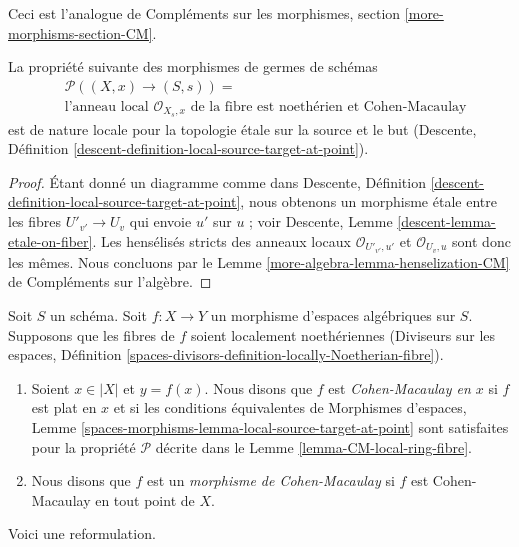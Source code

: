 \noindent
Ceci est l'analogue de Compléments sur les morphismes, section
\ref{more-morphisms-section-CM}.

\begin{lemma}
\label{lemma-CM-local-ring-fibre}
La propriété suivante des morphismes de germes de schémas
\begin{align*}
& \mathcal{P}((X, x) \to (S, s)) = \\
& \text{l'anneau local }
\mathcal{O}_{X_s, x}
\text{ de la fibre est noethérien et Cohen-Macaulay}
\end{align*}
est de nature locale pour la topologie étale sur la source et le but (Descente, Définition
\ref{descent-definition-local-source-target-at-point}).
\end{lemma}

\begin{proof}
Étant donné un diagramme comme dans
Descente, Définition \ref{descent-definition-local-source-target-at-point},
nous obtenons un morphisme étale entre les fibres
$U'_{v'} \to U_v$ qui envoie $u'$ sur $u$ ; voir
Descente, Lemme \ref{descent-lemma-etale-on-fiber}.
Les hensélisés stricts des anneaux locaux
$\mathcal{O}_{U'_{v'}, u'}$ et $\mathcal{O}_{U_v, u}$
sont donc les mêmes. Nous concluons par le
Lemme \ref{more-algebra-lemma-henselization-CM} de Compléments sur l'algèbre.
\end{proof}

\begin{definition}
\label{definition-CM}
Soit $S$ un schéma.
Soit $f : X \to Y$ un morphisme d'espaces algébriques sur $S$.
Supposons que les fibres de $f$ soient localement noethériennes
(Diviseurs sur les espaces, Définition
\ref{spaces-divisors-definition-locally-Noetherian-fibre}).
\begin{enumerate}
\item Soient $x \in |X|$ et $y = f(x)$. Nous disons que $f$ est
{\it Cohen-Macaulay en $x$} si $f$ est plat en $x$ et si
les conditions équivalentes de
Morphismes d'espaces, Lemme
\ref{spaces-morphisms-lemma-local-source-target-at-point}
sont satisfaites pour la propriété $\mathcal{P}$ décrite dans le
Lemme \ref{lemma-CM-local-ring-fibre}.
\item Nous disons que $f$ est un {\it morphisme de Cohen-Macaulay} si $f$ est
Cohen-Macaulay en tout point de $X$.
\end{enumerate}
\end{definition}

\noindent
Voici une reformulation.

